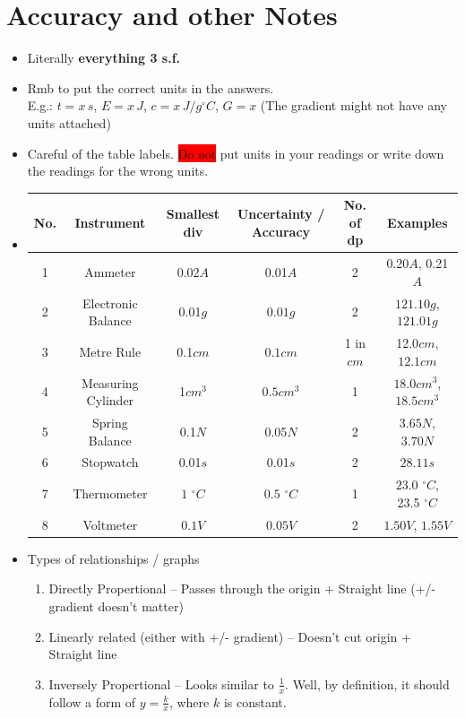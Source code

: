 \documentclass[oneside]{book}
\begin{document}
\chapter{Accuracy and other Notes}
\begin{itemize}[label=\(\square\)]
    \item Literally \textbf{everything 3 s.f.}
    \item Rmb to put the correct units in the answers.\\
    \scriptsize E.g.: \(t=x\,s\), \(E=x\,J\), \(c=x\,J/g^{\circ}C\), \(G=x\) (The gradient might not have any units attached) \footnotesize
    \item Careful of the table labels. \colorbox{red}{Do not} put units in your readings or write down the readings for the wrong units.
    \item \bigskip 
    \begin{tabular}{|c|c|c|c|c|c|}
        \hline 
        No. & Instrument & Smallest div & Uncertainty / Accuracy & No. of dp & Examples\\
        \hline
        1 & Ammeter & 0.02\(A\) & 0.01\(A\) & 2 & 0.20\(A\), 0.21\(A\)\\ 
        \hline
        2 & Electronic Balance & 0.01\(g\) & \(0.01g\) & 2 & \(121.10g\), \(121.01g\)\\
        \hline
        3 & Metre Rule & 0.1\(cm\) & \(0.1cm\) & 1 in \(cm\) & 12.0\(cm\), \(12.1cm\)\\
        \hline
        4 & Measuring Cylinder & 1\(cm^3\) & \(0.5cm^3\) & 1 & \(18.0cm^3\), \(18.5cm^3\)\\
        \hline
        5 & Spring Balance & 0.1\(N\) & 0.05\(N\) & 2 & \(3.65N\), \(3.70N\)\\
        \hline
        6 & Stopwatch & 0.01\(s\) & 0.01\(s\) & 2 & \(28.11s\)\\
        \hline
        7 & Thermometer & \(1\) \(^{\circ}C\) & \(0.5\) \(^{\circ}C\) & 1 & \(23.0\) \(^{\circ}C\), 23.5 \(^{\circ}C\)\\
        \hline
        8 & Voltmeter & \(0.1V\) & \(0.05V\) & 2 & \(1.50V\), \(1.55V\)\\
        \hline
    \end{tabular}
    \item Types of relationships / graphs
    \begin{enumerate}
        \item Directly Propertional -- Passes through the origin + Straight line (+/- gradient doesn't matter)
        \item Linearly related (either with +/- gradient) -- Doesn't cut origin + Straight line 
        \item Inversely Propertional -- Looks similar to \(\frac{1}{x}\). Well, by definition, it should follow a form of \(y=\frac{k}{x}\), where \(k\) is constant. 
    \end{enumerate}
\end{itemize}
\begingroup
\vspace{2.5cm}
\let\clearpage\relax
\end{document}
